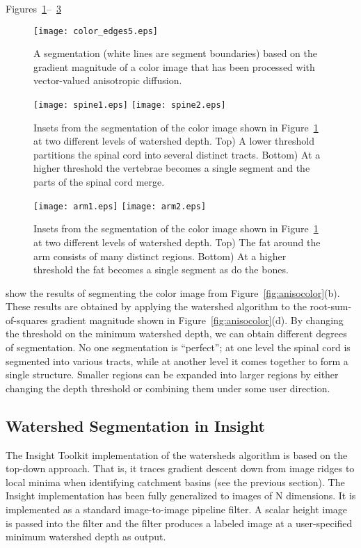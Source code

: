 Figures~\ref{fig:colorsegment1}--~\ref{fig:colorsegment3}
\begin{figure}
\centering
\texttt{[image: color\_edges5.eps]}
\caption{
A segmentation (white lines are segment boundaries) based on 
the gradient magnitude of a color image that has been processed with 
vector-valued anisotropic diffusion.}
\protect\label{fig:colorsegment1}
\end{figure}
\begin{figure}
\centering
\texttt{[image: spine1.eps]}
\texttt{[image: spine2.eps]}
\caption{
Insets from the segmentation of the color image shown in 
Figure~\protect\ref{fig:colorsegment1} at two different levels of 
watershed depth.  Top) A lower threshold partitions the spinal cord
into several distinct tracts.  Bottom) At a higher threshold the 
vertebrae becomes a single segment and the parts of the 
spinal cord merge.
}
\protect\label{fig:colorsegment2}
\end{figure}
\begin{figure}
\centering
\texttt{[image: arm1.eps]}
\texttt{[image: arm2.eps]}
\caption{
Insets from the segmentation of the color image shown in 
Figure~\protect\ref{fig:colorsegment1} at two different levels of 
watershed depth.  Top) The fat around the arm consists of many 
distinct regions.  Bottom) At a higher threshold the 
fat becomes a single segment as do the bones.
}
\protect\label{fig:colorsegment3}
\end{figure}
show the results of segmenting the color image from
Figure~\ref{fig:anisocolor}(b).  These results are obtained by applying the
watershed algorithm to the root-sum-of-squares gradient magnitude shown in
Figure~\ref{fig:anisocolor}(d).  By changing the threshold on the minimum
watershed depth, we can obtain different degrees of segmentation.  No one
segmentation is ``perfect''; at one level the spinal cord is segmented into
various tracts, while at another level it comes together to form a single
structure.  Smaller regions can be expanded into larger regions by either
changing the depth threshold or combining them under some user direction.

\subsection{Watershed Segmentation in Insight}
\label{sec:ImplementationWatersheds}
The Insight Toolkit implementation of the watersheds algorithm is based on the
top-down approach.  That is, it traces gradient descent down from image ridges
to local minima when identifying catchment basins (see the previous
section). The Insight implementation has been fully generalized to images of N
dimensions.  It is implemented as a standard image-to-image pipeline filter.
A scalar height image is passed into the filter and the filter produces a
labeled image at a user-specified minimum watershed depth as output.

